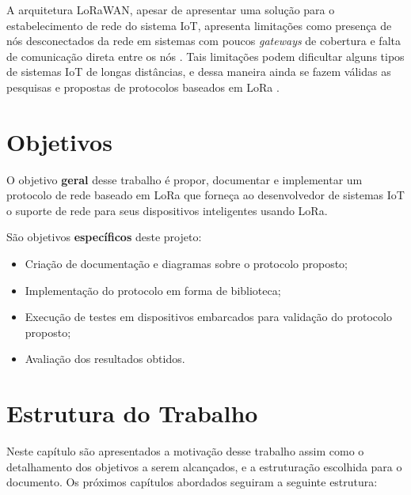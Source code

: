 A arquitetura LoRaWAN, apesar de apresentar uma solução para o estabelecimento
de rede do sistema IoT, apresenta limitações como presença de nós
desconectados da rede em sistemas com poucos \textit{gateways} de cobertura e
falta de comunicação direta entre os nós \cite{8767242}. 
Tais limitações podem dificultar alguns tipos de sistemas IoT de longas 
distâncias, e dessa maneira ainda se fazem válidas as pesquisas e propostas de 
protocolos baseados em LoRa \cite{8767242}\cite{NAKAMURA2022257}.

\section{Objetivos}

O objetivo \textbf{geral} desse trabalho é propor, documentar e implementar um
protocolo de rede baseado em LoRa que forneça ao desenvolvedor de sistemas IoT
o suporte de rede para seus dispositivos inteligentes usando LoRa.

São objetivos \textbf{específicos} deste projeto:
\begin{itemize}
    \item Criação de documentação e diagramas sobre o protocolo proposto;
	\item Implementação do protocolo em forma de biblioteca;
	\item Execução de testes em dispositivos embarcados para validação do protocolo proposto;
	\item Avaliação dos resultados obtidos.
\end{itemize}

\section{Estrutura do Trabalho}

Neste capítulo são apresentados a motivação desse trabalho assim como o detalhamento dos
objetivos a serem alcançados, e a estruturação escolhida para o documento. Os próximos
capítulos abordados seguiram a seguinte estrutura:

